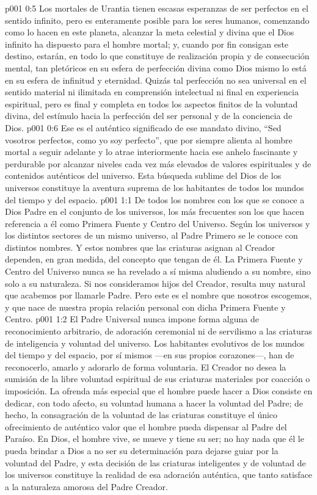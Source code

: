 \vs p001 0:5 Los mortales de Urantia tienen escasas esperanzas de ser perfectos en el sentido infinito, pero es enteramente posible para los seres humanos, comenzando como lo hacen en este planeta, alcanzar la meta celestial y divina que el Dios infinito ha dispuesto para el hombre mortal; y, cuando por fin consigan este destino, estarán, en todo lo que constituye de realización propia y de consecución mental, tan pletóricos en su esfera de perfección divina como Dios mismo lo está en su esfera de infinitud y eternidad. Quizás tal perfección no sea universal en el sentido material ni ilimitada en comprensión intelectual ni final en experiencia espiritual, pero es final y completa en todos los aspectos finitos de la voluntad divina, del estímulo hacia la perfección del ser personal y de la conciencia de Dios.
\vs p001 0:6 Ese es el auténtico significado de ese mandato divino, “Sed vosotros perfectos, como yo soy perfecto”, que por siempre alienta al hombre mortal a seguir adelante y lo atrae interiormente hacia ese anhelo fascinante y perdurable por alcanzar niveles cada vez más elevados de valores espirituales y de contenidos auténticos del universo. Esta búsqueda sublime del Dios de los universos constituye la aventura suprema de los habitantes de todos los mundos del tiempo y del espacio.
\vs p001 1:1 De todos los nombres con los que se conoce a Dios Padre en el conjunto de los universos, los más frecuentes son los que hacen referencia a él como Primera Fuente y Centro del Universo. Según los universos y los distintos sectores de un mismo universo, al Padre Primero se le conoce con distintos nombres. Y estos nombres que las criaturas asignan al Creador dependen, en gran medida, del concepto que tengan de él. La Primera Fuente y Centro del Universo nunca se ha revelado a sí misma aludiendo a su nombre, sino solo a su naturaleza. Si nos consideramos hijos del Creador, resulta muy natural que acabemos por llamarle Padre. Pero este es el nombre que nosotros escogemos, y que nace de nuestra propia relación personal con dicha Primera Fuente y Centro.
\vs p001 1:2 El Padre Universal nunca impone forma alguna de reconocimiento arbitrario, de adoración ceremonial ni de servilismo a las criaturas de inteligencia y voluntad del universo. Los habitantes evolutivos de los mundos del tiempo y del espacio, por sí mismos ---en sus propios corazones---, han de reconocerlo, amarlo y adorarlo de forma voluntaria. El Creador no desea la sumisión de la libre voluntad espiritual de sus criaturas materiales por coacción o imposición. La ofrenda más especial que el hombre puede hacer a Dios consiste en dedicar, con todo afecto, su voluntad humana a hacer la voluntad del Padre; de hecho, la consagración de la voluntad de las criaturas constituye el único ofrecimiento de auténtico valor que el hombre pueda dispensar al Padre del Paraíso. En Dios, el hombre vive, se mueve y tiene su ser; no hay nada que él le pueda brindar a Dios a no ser su determinación para dejarse guiar por la voluntad del Padre, y esta decisión de las criaturas inteligentes y de voluntad de los universos constituye la realidad de esa adoración auténtica, que tanto satisface a la naturaleza amorosa del Padre Creador.
